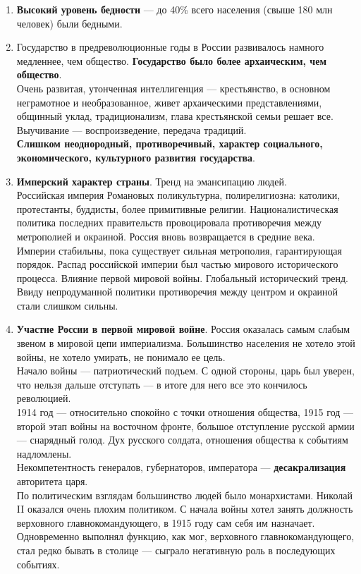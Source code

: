 \documentclass{article}
\begin{document}
\begin{enumerate}
    \item \textbf{Высокий уровень бедности} — до 40\% всего населения (свыше 180 млн человек) были бедными.
    \item Государство в предреволюционные годы в России развивалось намного медленнее, чем общество. \textbf{Государство было более архаическим, чем общество}. \\
    Очень развитая, утонченная интеллигенция — крестьянство, в основном неграмотное и необразованное, живет архаическими представлениями, общинный уклад, традиционализм, глава крестьянской семьи решает все. Выучивание — воспроизведение, передача традиций. \\
    \textbf{Слишком неоднородный, противоречивый, характер социального, экономического, культурного развития государства}.
    \item \textbf{Имперский характер страны}. Тренд на эмансипацию людей. \\
    Российская империя Романовых поликультурна, полирелигиозна: католики, протестанты, буддисты, более примитивные религии. Националистическая политика последних правительств провоцировала противоречия между метрополией и окраиной. Россия вновь возвращается в средние века. \\
    Империи стабильны, пока существует сильная метрополия, гарантирующая порядок. Распад российской империи был частью мирового исторического процесса. Влияние первой мировой войны. Глобальный исторический тренд. \\
    Ввиду непродуманной политики противоречия между центром и окраиной стали слишком сильны.
    \item \textbf{Участие России в первой мировой войне}. Россия оказалась самым слабым звеном в мировой цепи империализма. Большинство населения не хотело этой войны, не хотело умирать, не понимало ее цель. \\
    Начало войны — патриотический подъем. С одной стороны, царь был уверен, что нельзя дальше отступать — в итоге для него все это кончилось революцией. \\
    1914 год — относительно спокойно с точки отношения общества, 1915 год — второй этап войны на восточном фронте, большое отступление русской армии — снарядный голод. Дух русского солдата, отношения общества к событиям надломлены. \\
    Некомпетентность генералов, губернаторов, императора — \textbf{десакрализация} авторитета царя. \\
    По политическим взглядам большинство людей было монархистами. Николай II оказался очень плохим политиком. С начала войны хотел занять должность верховного главнокомандующего, в 1915 году сам себя им назначает. Одновременно выполнял функцию, как мог, верховного главнокомандующего, стал редко бывать в столице — сыграло негативную роль в последующих событиях. \\

\end{enumerate}
\end{document}

